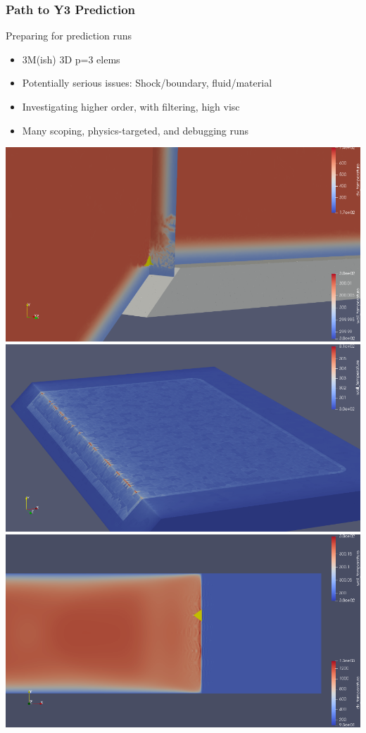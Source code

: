 \begin{frame}\frametitle{Path to Y3 Prediction}
\begin{center}
\item Preparing for prediction runs
\end{center}
\begin{multicols}{2}
\begin{itemize}
\item 3M(ish) 3D p=3 elems 
\item Potentially serious issues: Shock/boundary, fluid/material
\item Investigating higher order, with filtering, high visc
\item Many scoping, physics-targeted, and debugging runs
\end{itemize}
\includegraphics[width=.45\textwidth]{figures/hot_edge.png}
\includegraphics[width=.48\textwidth]{figures/3d_yellow_cells.png}
\includegraphics[width=.48\textwidth]{figures/2d_yellow_cells.png}
\end{multicols}
\end{frame}

